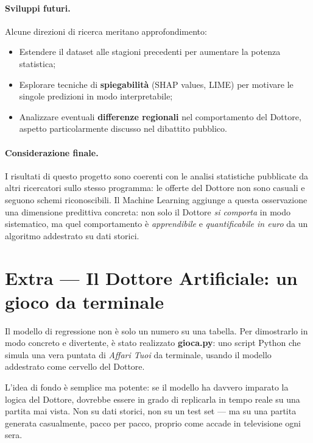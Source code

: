 \documentclass[12pt, a4paper]{article}
\begin{document}
\paragraph{Sviluppi futuri.}
Alcune direzioni di ricerca meritano approfondimento:
\begin{itemize}
  \item Estendere il dataset alle stagioni precedenti per aumentare la potenza
        statistica;
  \item Esplorare tecniche di \textbf{spiegabilità} (SHAP values, LIME) per
        motivare le singole predizioni in modo interpretabile;
  \item Analizzare eventuali \textbf{differenze regionali} nel comportamento
        del Dottore, aspetto particolarmente discusso nel dibattito pubblico.
\end{itemize}

\paragraph{Considerazione finale.}
I risultati di questo progetto sono coerenti con le analisi statistiche
pubblicate da altri ricercatori sullo stesso programma: le offerte del Dottore
non sono casuali e seguono schemi riconoscibili. Il Machine Learning aggiunge
a questa osservazione una dimensione predittiva concreta: non solo il Dottore
\textit{si comporta} in modo sistematico, ma quel comportamento è
\textit{apprendibile} e \textit{quantificabile in euro} da un algoritmo
addestrato su dati storici.

\section*{Extra — Il Dottore Artificiale: un gioco da terminale}

Il modello di regressione non è solo un numero su una tabella.
Per dimostrarlo in modo concreto e divertente, è stato realizzato
\textbf{gioca.py}: uno script Python che simula una vera puntata di
\textit{Affari Tuoi} da terminale, usando il modello addestrato come
cervello del Dottore.

L'idea di fondo è semplice ma potente: se il modello ha davvero imparato
la logica del Dottore, dovrebbe essere in grado di replicarla in tempo
reale su una partita mai vista. Non su dati storici, non su un test set
— ma su una partita generata casualmente, pacco per pacco, proprio come
accade in televisione ogni sera.
\end{document}
